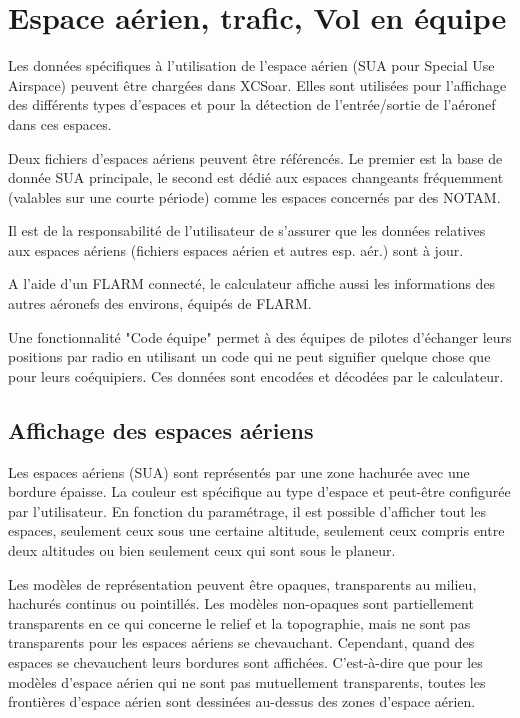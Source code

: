 \chapter{Espace aérien, trafic, Vol en équipe}\label{cha:airspace}
Les données spécifiques à l'utilisation de l'espace aérien (SUA pour Special Use Airspace) peuvent être chargées dans XCSoar. Elles sont utilisées pour l'affichage des différents types d'espaces et pour la détection de l'entrée/sortie de l'aéronef dans ces espaces.

Deux fichiers d'espaces aériens peuvent être référencés. Le premier est la base de donnée SUA principale, le second est dédié aux espaces changeants fréquemment (valables sur une courte période) comme les espaces concernés par des NOTAM.

Il est de la responsabilité de l'utilisateur de s'assurer que les données relatives aux espaces aériens (fichiers espaces aérien et autres esp. aér.) sont à jour.

A l'aide d'un FLARM connecté, le calculateur affiche aussi les informations des autres aéronefs des environs, équipés de FLARM.

Une fonctionnalité "Code équipe" permet à des équipes de pilotes d'échanger leurs positions par radio en utilisant un code qui ne peut signifier quelque chose que pour leurs coéquipiers. Ces données sont encodées et décodées par le calculateur.

\section{Affichage des espaces aériens}
Les espaces aériens (SUA) sont représentés par une zone hachurée avec une bordure épaisse. La couleur est spécifique au type d'espace et peut-être configurée par l'utilisateur. En fonction du paramétrage, il est possible d'afficher tout les espaces, seulement ceux sous une certaine altitude, seulement ceux compris entre deux altitudes ou bien seulement ceux qui sont sous le planeur.

Les modèles de représentation peuvent être opaques, transparents au milieu, hachurés  continus ou pointillés. Les modèles non-opaques sont partiellement transparents en ce qui concerne le relief et la topographie, mais ne sont pas transparents pour les espaces aériens se chevauchant. Cependant, quand des espaces se chevauchent leurs bordures sont affichées. C'est-à-dire que pour les modèles d'espace aérien qui ne sont pas mutuellement transparents, toutes les frontières d'espace aérien sont dessinées au-dessus des zones d'espace aérien.

